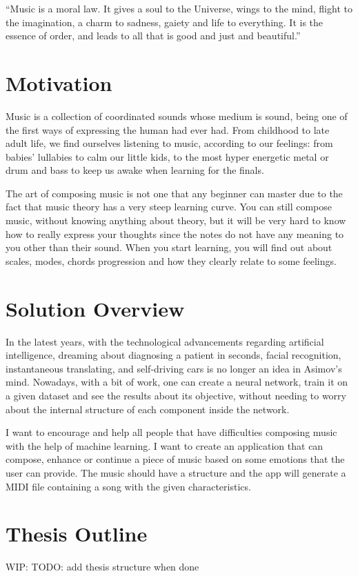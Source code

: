 “Music is a moral law. It gives a soul to the Universe, wings to the mind, flight to the imagination, a charm to sadness, gaiety and life to everything.
It is the essence of order, and leads to all that is good and just and beautiful.” \cite{quotationDictionary}

\section{Motivation}
Music is a collection of coordinated sounds \cite{whatIsMusic} whose medium is sound,
being one of the first ways of expressing the human had ever had.
From childhood to late adult life, we find ourselves listening to music, according to our feelings:
from babies’ lullabies to calm our little kids,
to the most hyper energetic metal or drum and bass to keep us awake when learning for the finals.

The art of composing music is not one that any beginner can master due to the fact that
music theory has a very steep learning curve.
You can still compose music, without knowing anything about theory,
but it will be very hard to know how to really express your
thoughts since the notes do not have any meaning to you other than their sound.
When you start learning, you will find out about scales,
modes, chords progression and how they clearly relate to some feelings.

\section{Solution Overview}

In the latest years, with the technological advancements regarding artificial intelligence,
dreaming about diagnosing a patient in seconds, facial recognition, instantaneous translating,
and self-driving cars is no longer an idea in Asimov’s mind.
Nowadays, with a bit of work, one can create a neural network,
train it on a given dataset and see the results about its objective,
without needing to worry about the internal structure of each component inside the network.

I want to encourage and help all people that have difficulties composing music with the help of machine learning.
I want to create an application that can compose,
enhance or continue a piece of music based on some emotions that the user can provide.
The music should have a structure and the app will generate
a MIDI file containing a song with the given characteristics.

\section{Thesis Outline}
WIP: TODO: add thesis structure when done